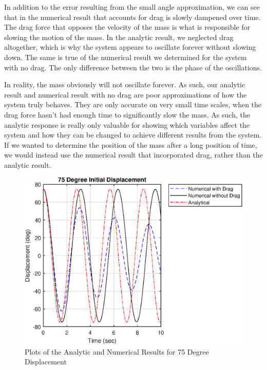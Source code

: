 \documentclass{article}
\begin{document}
In addition to the error resulting from the small angle approximation, we can see that in the numerical result that accounts for drag is slowly dampened over time. The drag force that opposes the velocity of the mass is what is responsible for slowing the motion of the mass. In the analytic result, we neglected drag altogether, which is why the system appears to oscillate forever without slowing down. The same is true of the numerical result we determined for the system with no drag. The only difference between the two is the phase of the oscillations. 

In reality, the mass obviously will not oscillate forever. As such, our analytic result and numerical result with no drag are poor approximations of how the system truly behaves. They are only accurate on very small time scales, when the drag force hasn't had enough time to significantly slow the mass. As such, the analytic response is really only valuable for showing which variables affect the system and how they can be changed to achieve different results from the system. If we wanted to determine the position of the mass after a long position of time, we would instead use the numerical result that incorporated drag, rather than the analytic result. 

\begin{figure}[h]
\centering
\includegraphics[width=1\textwidth]{Pendulum_03.eps}
\caption{Plots of the Analytic and Numerical Results for 75 Degree Displacement}
\label{75}
\end{figure}
\pagebreak
\end{document}
